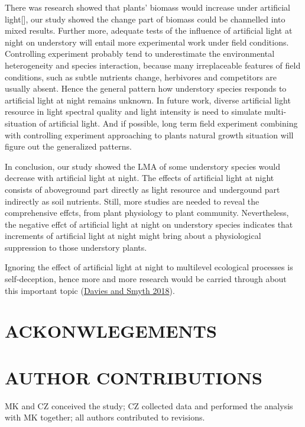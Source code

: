 \documentclass[
]{article}
\begin{document}
There was research showed that plants' biomass would increase under
artificial light{[}{]}, our study showed the change part of biomass
could be channelled into mixed results. Further more, adequate tests of
the influence of artificial light at night on understory will entail
more experimental work under field conditions. Controlling experiment
probably tend to underestimate the environmental heterogeneity and
species interaction, because many irreplaceable features of field
conditions, such as subtle nutrients change, herbivores and competitors
are usually absent. Hence the general pattern how understory species
responds to artificial light at night remains unknown. In future work,
diverse artificial light resource in light spectral quality and light
intensity is need to simulate multi-situation of artificial light. And
if possible, long term field experiment combining with controlling
experiment approaching to plants natural growth situation will figure
out the generalized patterns.

In conclusion, our study showed the LMA of some understory species would
decrease with artificial light at night. The effects of artificial light
at night consists of aboveground part directly as light resource and
undergound part indirectly as soil nutrients. Still, more studies are
needed to reveal the comprehensive effcts, from plant physiology to
plant community. Nevertheless, the negative effct of artificial light at
night on understory species indicates that increments of artificial
light at night might bring about a physiological suppression to those
understory plants.

Ignoring the effect of artificial light at night to multilevel
ecological processes is self-deception, hence more and more research
would be carried through about this important topic
(\protect\hyperlink{ref-Davies2018}{Davies and Smyth 2018}).

\hypertarget{ackonwlegements}{%
\section{ACKONWLEGEMENTS}\label{ackonwlegements}}

\hypertarget{author-contributions}{%
\section{AUTHOR CONTRIBUTIONS}\label{author-contributions}}

MK and CZ conceived the study; CZ collected data and performed the
analysis with MK together; all authors contributed to revisions.
\end{document}

